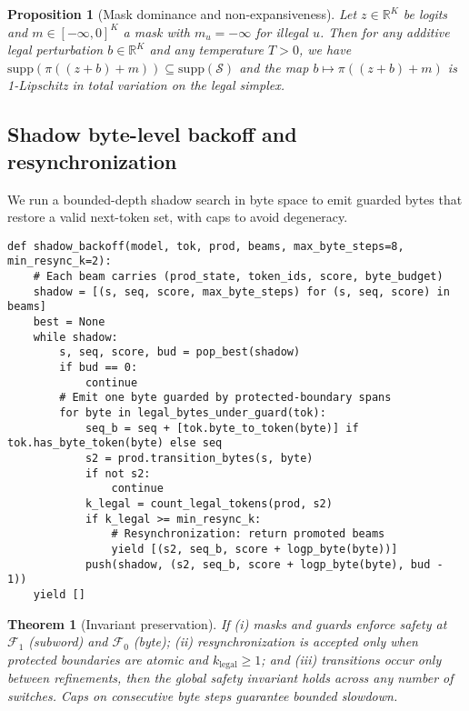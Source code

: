 \documentclass{article}
\newtheorem{proposition}{Proposition}
\newtheorem{theorem}{Theorem}
\begin{document}
\begin{proposition}[Mask dominance and non-expansiveness]
Let $z\in\mathbb{R}^K$ be logits and $m\in[-\infty,0]^K$ a mask with $m_u=-\infty$ for illegal $u$. Then for any additive legal perturbation $b\in\mathbb{R}^K$ and any temperature $T>0$, we have $\mathrm{supp}(\pi((z+b)+m))\subseteq \mathrm{supp}(\mathcal{S})$ and the map $b\mapsto \pi((z+b)+m)$ is 1-Lipschitz in total variation on the legal simplex.
\end{proposition}

\subsection{Shadow byte-level backoff and resynchronization}
We run a bounded-depth shadow search in byte space to emit guarded bytes that restore a valid next-token set, with caps to avoid degeneracy.

\begin{lstlisting}[style=py, caption={Shadow byte-level backoff with resynchronization and caps.}]
def shadow_backoff(model, tok, prod, beams, max_byte_steps=8, min_resync_k=2):
    # Each beam carries (prod_state, token_ids, score, byte_budget)
    shadow = [(s, seq, score, max_byte_steps) for (s, seq, score) in beams]
    best = None
    while shadow:
        s, seq, score, bud = pop_best(shadow)
        if bud == 0: 
            continue
        # Emit one byte guarded by protected-boundary spans
        for byte in legal_bytes_under_guard(tok):
            seq_b = seq + [tok.byte_to_token(byte)] if tok.has_byte_token(byte) else seq
            s2 = prod.transition_bytes(s, byte)
            if not s2: 
                continue
            k_legal = count_legal_tokens(prod, s2)
            if k_legal >= min_resync_k:
                # Resynchronization: return promoted beams
                yield [(s2, seq_b, score + logp_byte(byte))]
            push(shadow, (s2, seq_b, score + logp_byte(byte), bud - 1))
    yield []
\end{lstlisting}

\begin{theorem}[Invariant preservation]\label{thm:mf}
If (i) masks and guards enforce safety at $\mathcal{F}_1$ (subword) and $\mathcal{F}_0$ (byte); (ii) resynchronization is accepted only when protected boundaries are atomic and $k_{\mathrm{legal}}\ge 1$; and (iii) transitions occur only between refinements, then the global safety invariant holds across any number of switches. Caps on consecutive byte steps guarantee bounded slowdown.
\end{theorem}
\end{document}
